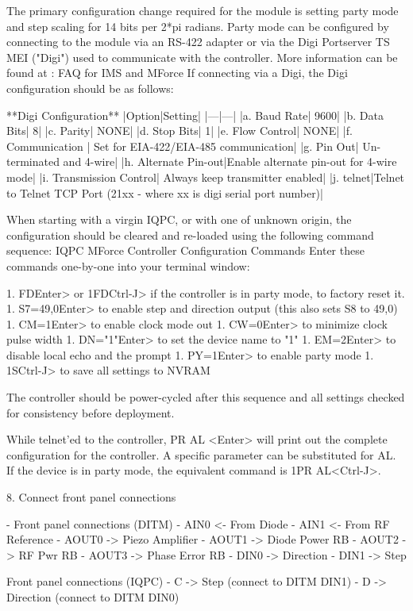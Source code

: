 \documentclass{article}
\begin{document}
The primary configuration change required for the module is setting party mode and step scaling for 14 bits per 2*pi radians. Party mode can be configured by connecting to the module via an RS-422 adapter or via the Digi Portserver TS MEI ("Digi") used to communicate with the controller. More information can be found at : FAQ for IMS and MForce
If connecting via a Digi, the Digi configuration should be as follows:

**Digi Configuration**
|Option|Setting|
|---|---|
|a. Baud Rate| 9600|
|b. Data Bits| 8|
|c. Parity| NONE|
|d. Stop Bits| 1|
|e. Flow Control| NONE|
|f. Communication | Set for EIA-422/EIA-485 communication|
|g. Pin Out| Un-terminated and 4-wire|
|h. Alternate Pin-out|Enable alternate pin-out for 4-wire mode|
|i. Transmission Control| Always keep transmitter enabled|
|j. telnet|Telnet to Telnet TCP Port (21xx - where xx is digi serial port number)|

When starting with a virgin IQPC, or with one of unknown origin, the configuration should be cleared and re-loaded using the following command sequence:
IQPC MForce Controller Configuration Commands
Enter these commands one-by-one into your terminal window:

1. FD\<Enter> or 1FD\<Ctrl-J> if the controller is in party mode, to factory reset it.
1. S7=49,0\<Enter> to enable step and direction output (this also sets S8 to 49,0)
1. CM=1\<Enter> to enable clock mode out
1. CW=0\<Enter> to minimize clock pulse width
1. DN="1"\<Enter> to set the device name to "1"
1. EM=2\<Enter> to disable local echo and the prompt
1. PY=1\<Enter> to enable party mode
1. 1S\<Ctrl-J> to save all settings to NVRAM

The controller should be power-cycled after this sequence and all settings checked for consistency before deployment.

While telnet'ed to the controller, PR AL <Enter> will print out the complete configuration for the controller. A specific parameter can be substituted for AL. If the device is in party mode, the equivalent command is 1PR AL<Ctrl-J>.

8. Connect front panel connections

- Front panel connections (DITM)
- AIN0 <- From Diode
- AIN1 <- From RF Reference
- AOUT0 -> Piezo Amplifier
- AOUT1 -> Diode Power RB
- AOUT2 -> RF Pwr RB
- AOUT3 -> Phase Error RB
- DIN0 -> Direction
- DIN1 -> Step

Front panel connections (IQPC)
- C -> Step (connect to DITM DIN1)
- D -> Direction (connect to DITM DIN0)
\end{document}

